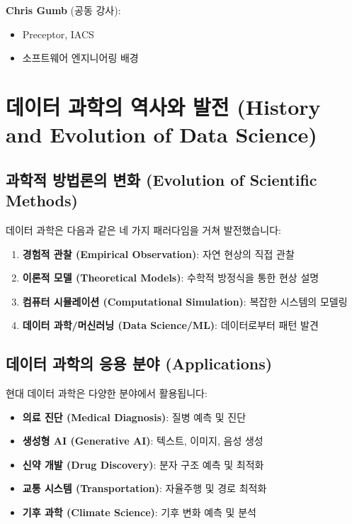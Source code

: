 \documentclass[12pt,a4paper]{article}
\begin{document}
\textbf{Chris Gumb} (공동 강사):
\begin{itemize}
    \item Preceptor, IACS
    \item 소프트웨어 엔지니어링 배경
\end{itemize}

\section{데이터 과학의 역사와 발전 (History and Evolution of Data Science)}

\subsection{과학적 방법론의 변화 (Evolution of Scientific Methods)}

데이터 과학은 다음과 같은 네 가지 패러다임을 거쳐 발전했습니다:

\begin{enumerate}
    \item \textbf{경험적 관찰 (Empirical Observation)}: 자연 현상의 직접 관찰
    \item \textbf{이론적 모델 (Theoretical Models)}: 수학적 방정식을 통한 현상 설명
    \item \textbf{컴퓨터 시뮬레이션 (Computational Simulation)}: 복잡한 시스템의 모델링
    \item \textbf{데이터 과학/머신러닝 (Data Science/ML)}: 데이터로부터 패턴 발견
\end{enumerate}

\subsection{데이터 과학의 응용 분야 (Applications)}

현대 데이터 과학은 다양한 분야에서 활용됩니다:

\begin{itemize}
    \item \textbf{의료 진단 (Medical Diagnosis)}: 질병 예측 및 진단
    \item \textbf{생성형 AI (Generative AI)}: 텍스트, 이미지, 음성 생성
    \item \textbf{신약 개발 (Drug Discovery)}: 분자 구조 예측 및 최적화
    \item \textbf{교통 시스템 (Transportation)}: 자율주행 및 경로 최적화
    \item \textbf{기후 과학 (Climate Science)}: 기후 변화 예측 및 분석
\end{itemize}
\end{document}
